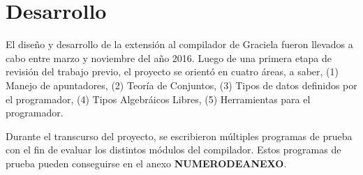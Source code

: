 \chapter{Desarrollo}
\label{capitulo3}

El diseño y desarrollo de la extensión al compilador de Graciela fueron llevados
a cabo entre marzo y noviembre del año 2016. Luego de una primera etapa de
revisión del trabajo previo, el proyecto se orientó en cuatro áreas, a saber,
(1) Manejo de apuntadores, (2) Teoría de Conjuntos, (3) Tipos de datos definidos
por el programador, (4) Tipos Algebráicos Libres, (5) Herramientas para el
programador.

Durante el transcurso del proyecto, se escribieron múltiples programas de prueba
con el fin de evaluar los distintos módulos del compilador. Estos programas de
prueba pueden conseguirse en el anexo \textbf{NUMERODEANEXO}.

%
%

